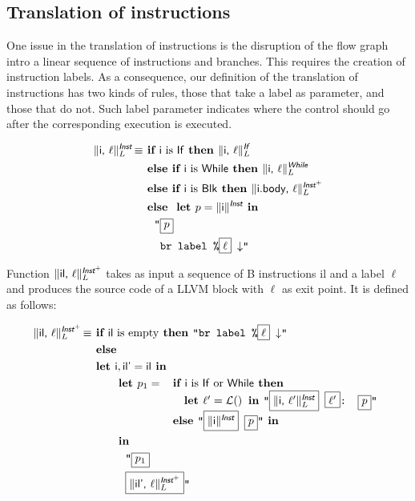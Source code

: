 \documentclass{llncs}
\newcommand{\trad}[2]{\ensuremath{\lVert \textsf{#1} \rVert^{\textit{#2}}}}
\newcommand{\nl}[0]{\ensuremath{\downarrow}}
\DeclareMathOperator{\isdef}{\equiv}
\DeclareMathOperator{\lbl}{\mathcal{L}()}
\newcommand{\llvm}[1]{\texttt{#1}}
\newcommand{\B}[1]{\textsf{#1}}
\newcommand{\ListOf}[1]{$\mbox{#1}^+$}
\newcommand{\IF}[0]{\textbf{ if }}
\newcommand{\ELSIF}[0]{\textbf{ else if }}
\newcommand{\ELSE}[0]{\textbf{ else }}
\newcommand{\THEN}[0]{\textbf{ then }}
\newcommand{\LET}[0]{\textbf{ let }}
\newcommand{\IN}[0]{\textbf{ in }}
\newcommand{\PH}[1]{\framebox{$#1$}}
\begin{document}
\subsection{Translation of instructions}
\label{sec:trad-instr}

One issue in the translation of instructions is the disruption of the flow graph
intro a linear sequence of instructions and branches. This requires the creation
of instruction labels. As a consequence, our definition of the translation of
instructions has two kinds of rules, those that take a label as parameter, and
those that do not. Such label parameter indicates where the control should go
after the corresponding execution is executed.

\begin{align*}
\trad{\B{i}, $\ell$}{\B{Inst}}_L \isdef
& \IF \B{i} \mbox{ is \B{If}} \THEN \trad{\B{i}, $\ell$}{\B{If}}_L \\
& \ELSIF \B{i} \mbox{ is \B{While}} \THEN \trad{\B{i}, $\ell$}{\B{While}}_L \\
& \ELSIF \B{i} \mbox{ is \B{Blk}} \THEN \trad{\B{i.body}, $\ell$}{\ListOf{\B{Inst}}}_L \\
& \ELSE \LET p = \trad{\B{i}}{\B{Inst}} \IN \\
& \quad \llvm{"\PH{p}} \\
& \quad \llvm{ br label \%\PH{\ell} \nl"}
\end{align*}

Function $\trad{\B{il}, $\ell$}{\ListOf{\B{Inst}}}_L$ takes as input a sequence
of B instructions \B{il} and a label $\ell$ and produces the source code of a
LLVM block with $\ell$ as exit point. It is defined as follows: 

\begin{align*}
\trad{\B{il}, $\ell$}{\ListOf{\B{Inst}}}_L \isdef & \IF \B{il} \mbox{ is empty} \THEN \llvm{"br label \%\PH{\ell} \nl"} \\
& \ELSE \\
& \LET \B{i}, \B{il'} = \B{il}  \IN \\
& \quad \quad \LET p_1 = 
\begin{array}[t]{l}
  \IF \B{i} \mbox{ is \B{If} or \B{While}} \THEN \\
  \quad \LET \ell' = \lbl \IN \llvm{"\PH{\trad{i, $\ell'$}{\B{Inst}}_L} \PH{\ell'}: \PH{p}"} \\
  \ELSE \llvm{"\PH{\trad{i}{\B{Inst}}} \PH{p}"} \IN
\end{array} \\
& \quad \quad \IN \\
& \quad \quad \quad \llvm{"\PH{p_1}} \\
& \quad \quad \quad \llvm{\PH{\trad{il', $\ell$}{\ListOf{\B{Inst}}}_L}"}
\end{align*}
\end{document}
